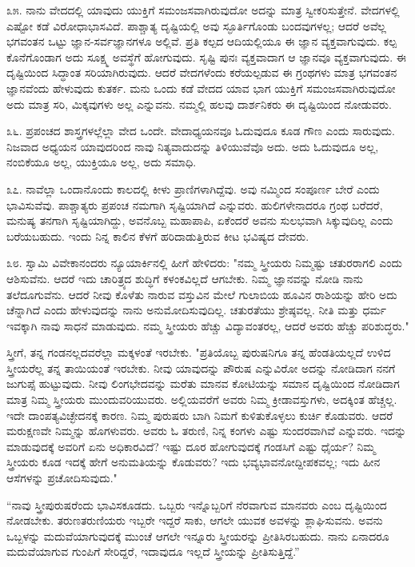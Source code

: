 ೩೫. ನಾನು ವೇದದಲ್ಲಿ ಯಾವುದು ಯುಕ್ತಿಗೆ ಸಮಂಜಸವಾಗಿರುವುದೋ ಅದನ್ನು ಮಾತ್ರ ಸ್ವೀಕರಿಸುತ್ತೇನೆ. ವೇದಗಳಲ್ಲಿ ಎಷ್ಟೋ ಕಡೆ ವಿರೋಧಾಭಾಸವಿದೆ. ಪಾಶ್ಚಾತ್ಯ ದೃಷ್ಟಿಯಲ್ಲಿ ಅವು ಸ್ಫೂರ್ತಿಗೊಂಡು ಬಂದವುಗಳಲ್ಲ; ಆದರೆ ಅವೆಲ್ಲ ಭಗವಂತನ ಒಟ್ಟು ಜ್ಞಾನ-ಸರ್ವಜ್ಞಾನಗಳೂ ಅಲ್ಲಿವೆ. ಪ್ರತಿ ಕಲ್ಪದ ಆದಿಯಲ್ಲಿಯೂ ಈ ಜ್ಞಾನ ವ್ಯಕ್ತವಾಗುವುದು. ಕಲ್ಪ ಕೊನೆಗೊಂಡಾಗ ಅದು ಸೂಕ್ಷ್ಮ ಅವಸ್ಥೆಗೆ ಹೋಗುವುದು. ಸೃಷ್ಟಿ ಪುನಃ ವ್ಯಕ್ತವಾದಾಗ ಆ ಜ್ಞಾನವೂ ವ್ಯಕ್ತವಾಗುವುದು. ಈ ದೃಷ್ಟಿಯಿಂದ ಸಿದ್ಧಾಂತ ಸರಿಯಾಗಿರುವುದು. ಆದರೆ ವೇದಗಳೆಂದು ಕರೆಯಲ್ಪಡುವ ಈ ಗ್ರಂಥಗಳು ಮಾತ್ರ ಭಗವಂತನ ಜ್ಞಾನವೆಂದು ಹೇಳುವುದು ಕುತರ್ಕ. ಮನು ಒಂದು ಕಡೆ ವೇದದ ಯಾವ ಭಾಗ ಯುಕ್ತಿಗೆ ಸಮಂಜಸವಾಗಿರುವುದೋ ಅದು ಮಾತ್ರ ಸರಿ, ಮಿಕ್ಕವುಗಳು ಅಲ್ಲ ಎನ್ನುವನು. ನಮ್ಮಲ್ಲಿ ಹಲವು ದಾರ್ಶನಿಕರು ಈ ದೃಷ್ಟಿಯಿಂದ ನೋಡುವರು.

೩೬. ಪ್ರಪಂಚದ ಶಾಸ್ತ್ರಗಳಲ್ಲೆಲ್ಲಾ ವೇದ ಒಂದೇ. ವೇದಾಧ್ಯಯನವೂ ಓದುವುದೂ ಕೂಡ ಗೌಣ ಎಂದು ಸಾರುವುದು. ನಿಜವಾದ ಅಧ್ಯಯನ ಯಾವುದರಿಂದ ನಾವು ನಿತ್ಯವಾದುದನ್ನು ತಿಳಿಯುವೆವೊ ಅದು. ಅದು ಓದುವುದೂ ಅಲ್ಲ, ನಂಬಿಕೆಯೂ ಅಲ್ಲ, ಯುಕ್ತಿಯೂ ಅಲ್ಲ, ಅದು ಸಮಾಧಿ.

೩೭. ನಾವೆಲ್ಲಾ ಒಂದಾನೊಂದು ಕಾಲದಲ್ಲಿ ಕೀಳು ಪ್ರಾಣಿಗಳಾಗಿದ್ದೆವು. ಅವು ನಮ್ಮಿಂದ ಸಂಪೂರ್ಣ ಬೇರೆ ಎಂದು ಭಾವಿಸುವೆವು. ಪಾಶ್ಚಾತ್ಯರು ಪ್ರಪಂಚ ನಮಗಾಗಿ ಸೃಷ್ಟಿಯಾಗಿದೆ ಎನ್ನುವರು. ಹುಲಿಗಳೇನಾದರೂ ಗ್ರಂಥ ಬರೆದರೆ, ಮನುಷ್ಯ ತನಗಾಗಿ ಸೃಷ್ಟಿಯಾಗಿದ್ದು, ಅವನೊಬ್ಬ ಮಹಾಪಾಪಿ, ಏಕೆಂದರೆ ಅವನು ಸುಲಭವಾಗಿ ಸಿಕ್ಕುವುದಿಲ್ಲ ಎಂದು ಬರೆಯಬಹುದು. ಇಂದು ನಿನ್ನ ಕಾಲಿನ ಕೆಳಗೆ ಹರಿದಾಡುತ್ತಿರುವ ಕೀಟ ಭವಿಷ್ಯದ ದೇವರು.

೩೮. ಸ್ವಾಮಿ ವಿವೇಕಾನಂದರು ನ್ಯೂಯಾರ್ಕಿನಲ್ಲಿ ಹೀಗೆ ಹೇಳಿದರು: "ನಮ್ಮ ಸ್ತ್ರೀಯರು ನಿಮ್ಮಷ್ಟು ಚತುರರಾಗಲಿ ಎಂದು ಆಶಿಸುವೆನು. ಆದರೆ ಇದು ಚಾರಿತ್ರ್ಯದ ಶುದ್ಧಿಗೆ ಕಳಂಕವಿಲ್ಲದೆ ಆಗಬೇಕು. ನಿಮ್ಮ ಜ್ಞಾನವನ್ನು ನೋಡಿ ನಾನು ತಲೆದೂಗುವೆನು. ಆದರೆ ನೀವು ಕೊಳೆತು ನಾರುವ ವಸ್ತುವಿನ ಮೇಲೆ ಗುಲಾಬಿಯ ಹೂವಿನ ರಾಶಿಯನ್ನು ಹೇರಿ ಅದು ಚೆನ್ನಾಗಿದೆ ಎಂದು ಹೇಳುವುದನ್ನು ನಾನು ಅನುಮೋದಿಸುವುದಿಲ್ಲ. ಚತುರತೆಯು ಶ್ರೇಷ್ಠವಲ್ಲ. ನೀತಿ ಮತ್ತು ಧರ್ಮ ಇವಕ್ಕಾಗಿ ನಾವು ಸಾಧನೆ ಮಾಡುವುದು. ನಮ್ಮ ಸ್ತ್ರೀಯರು ಹೆಚ್ಚು ವಿದ್ಯಾವಂತರಲ್ಲ, ಆದರೆ ಅವರು ಹೆಚ್ಚು ಪರಿಶುದ್ಧರು."

ಸ್ತ್ರೀಗೆ, ತನ್ನ ಗಂಡನಲ್ಲದವರೆಲ್ಲಾ ಮಕ್ಕಳಂತೆ ಇರಬೇಕು. "ಪ್ರತಿಯೊಬ್ಬ ಪುರುಷನಿಗೂ ತನ್ನ ಹೆಂಡತಿಯಲ್ಲದೆ ಉಳಿದ ಸ್ತ್ರೀಯರೆಲ್ಲ ತನ್ನ ತಾಯಿಯಂತೆ ಇರಬೇಕು. ನೀವು ಯಾವುದನ್ನು ಪೌರುಷ  ಎನ್ನುವಿರೋ ಅದನ್ನು ನೋಡಿದಾಗ ನನಗೆ ಜುಗುಪ್ಸೆ ಹುಟ್ಟುವುದು. ನೀವು ಲಿಂಗಭೇದವನ್ನು ಮರೆತು ಮಾನವ ಕೋಟಿಯನ್ನು ಸಮಾನ ದೃಷ್ಟಿಯಿಂದ ನೋಡಿದಾಗ ಮಾತ್ರ ನಿಮ್ಮ ಸ್ತ್ರೀಯರು ಮುಂದುವರಿಯುವರು. ಅಲ್ಲಿಯವರೆಗೆ ಅವರು ನಿಮ್ಮ ಕ್ರೀಡಾವಸ್ತುಗಳು, ಅದಕ್ಕಿಂತ ಹೆಚ್ಚಲ್ಲ. ಇದೇ ದಾಂಪತ್ಯವಿಚ್ಛೇದನಕ್ಕೆ ಕಾರಣ. ನಿಮ್ಮ ಪುರುಷರು ಬಾಗಿ ನಿಮಗೆ ಕುಳಿತುಕೊಳ್ಳಲು ಕುರ್ಚಿ ಕೊಡುವರು. ಆದರೆ ಮರುಕ್ಷಣವೇ ನಿಮ್ಮನ್ನು ಹೊಗಳುವರು. ಅವರು ಓ ತರುಣಿ, ನಿನ್ನ ಕಂಗಳು ಎಷ್ಟು ಸುಂದರವಾಗಿವೆ ಎನ್ನುವರು. ಇದನ್ನು ಮಾಡುವುದಕ್ಕೆ ಅವರಿಗೆ ಏನು ಅಧಿಕಾರವಿದೆ? ಇಷ್ಟು ದೂರ ಹೋಗುವುದಕ್ಕೆ ಗಂಡಸಿಗೆ ಎಷ್ಟು ಧೈರ್ಯ? ನಿಮ್ಮ ಸ್ತ್ರೀಯರು ಕೂಡ ಇದಕ್ಕೆ ಹೇಗೆ ಅನುಮತಿಯನ್ನು ಕೊಡುವರು? ಇದು ಭವ್ಯಭಾವನೋದ್ದೀಪಕವಲ್ಲ; ಇದು ಹೀನ ಆಸೆಗಳನ್ನು ಪ್ರಚೋದಿಸುವುದು."

“ನಾವು ಸ್ತ್ರೀಪುರುಷರೆಂದು ಭಾವಿಸಕೂಡದು. ಒಬ್ಬರು ಇನ್ನೊಬ್ಬರಿಗೆ ನೆರವಾಗುವ ಮಾನವರು ಎಂಬ ದೃಷ್ಟಿಯಿಂದ ನೋಡಬೇಕು. ತರುಣತರುಣಿಯರು ಇಬ್ಬರೇ ಇದ್ದರೆ ಸಾಕು, ಆಗಲೇ ಯುವಕ ಅವಳನ್ನು ಶ್ಲಾಘಿಸುವನು. ಅವನು ಒಬ್ಬಳನ್ನು ಮದುವೆಯಾಗುವುದಕ್ಕೆ ಮುಂಚೆ ಆಗಲೇ ಇನ್ನೂರು ಸ್ತ್ರೀಯರನ್ನು ಪ್ರೀತಿಸಿರಬಹುದು. ನಾನು ಏನಾದರೂ ಮದುವೆಯಾಗುವ ಗುಂಪಿಗೆ ಸೇರಿದ್ದರೆ, ಇದಾವುದೂ ಇಲ್ಲದೆ ಸ್ತ್ರೀಯನ್ನು ಪ್ರೀತಿಸುತ್ತಿದ್ದೆ.”

